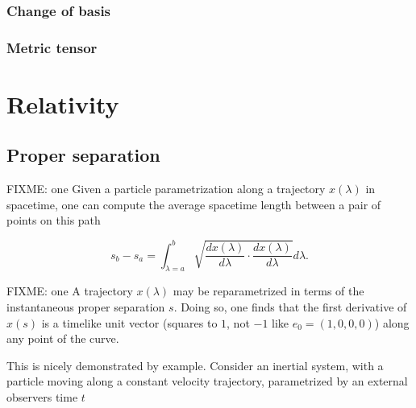 \subsubsection{Change of basis}


\subsubsection{Metric tensor}

\section{Relativity}
\subsection{Proper separation}

FIXME: one
Given a particle parametrization along a trajectory $x(\lambda)$ in spacetime, one can compute the average spacetime length between a pair of points on this path

\begin{equation}\label{eqn:grahamSchmidtLorentz:400}
s_b - s_a = \int_{\lambda = a}^b \sqrt{ \frac{d x(\lambda)}{d\lambda} \cdot \frac{d x(\lambda)}{d\lambda} } d\lambda.
\end{equation}

%
%
%

FIXME: one
A trajectory $x(\lambda)$ may be reparametrized in terms of the instantaneous proper separation $s$.  Doing so, one finds that the first derivative of $x(s)$ is a timelike unit vector (squares to $1$, not $-1$ like $e_0 = (1, 0, 0, 0)$) along any point of the curve.

This is nicely demonstrated by example.
%
%
Consider an inertial system, with a particle moving along a constant velocity trajectory, parametrized by an external observers time $t$

